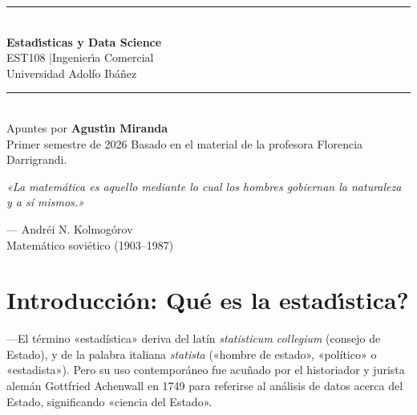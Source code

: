 \documentclass[12pt, a4paper]{book}
\numberwithin{equation}{chapter}
\begin{document}
\begin{titlepage}
    \centering
    \vspace*{2.5cm}
    {\color{azul}\rule{\linewidth}{1.5pt}}\\[0.5cm]
    {\fontsize{32}{38}\selectfont\bfseries\color{azul}
        Estad\'{\i}sticas y Data Science}\\[0.4cm]
    {\Large EST108 \quad|\quad Ingenier\'{\i}a Comercial}\\[0.2cm]
    {\large Universidad Adolfo Ib\'a\~{n}ez}\\[0.1cm]
    {\color{azul}\rule{\linewidth}{1.5pt}}\\[2cm]
    {\Large Apuntes por \textbf{Agust\'{\i}n Miranda}}\\[0.5cm]
    {\large Primer semestre de 2026}
    \vfill
    {\small Basado en el material de la profesora Florencia Darrigrandi.}
\end{titlepage}

\newpage
\thispagestyle{empty}
\vspace*{\fill}
\begin{center}
	{\large\itshape «La matem\'{a}tica es aquello mediante lo cual
		los hombres gobiernan la naturaleza y a s\'{i} mismos.»}
	
	\bigskip
	{\normalsize --- Andr\'{e}i N. Kolmog\'{o}rov}\\[4pt]
	{\small Matem\'{a}tico sovi\'{e}tico (1903--1987)}
\end{center}
\vspace*{\fill}
\newpage

\tableofcontents
\clearpage

\chapter*{Introducci\'{o}n: \textquestiondown Qu\'{e} es la estad\'{\i}stica?}

---El término «estadística» deriva del latín \textit{statisticum collegium} (consejo de Estado), y de la palabra italiana \textit{statista} («hombre de estado», «político» o «estadista»). Pero su uso contemporáneo fue acuñado por el historiador y jurista alemán Gottfried Achenwall en 1749 para referirse al análisis de datos acerca del Estado, significando «ciencia del Estado».
\end{document}
